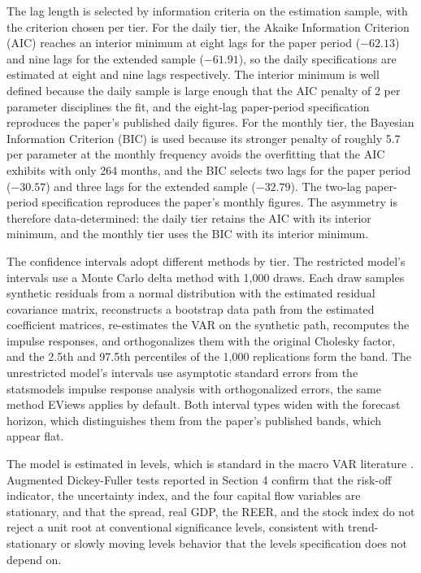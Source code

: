 The lag length is selected by information criteria on the estimation sample, with the criterion chosen per tier. For the daily tier, the Akaike Information Criterion (AIC) reaches an interior minimum at eight lags for the paper period ($-62.13$) and nine lags for the extended sample ($-61.91$), so the daily specifications are estimated at eight and nine lags respectively. The interior minimum is well defined because the daily sample is large enough that the AIC penalty of 2 per parameter disciplines the fit, and the eight-lag paper-period specification reproduces the paper's published daily figures. For the monthly tier, the Bayesian Information Criterion (BIC) is used because its stronger penalty of roughly 5.7 per parameter at the monthly frequency avoids the overfitting that the AIC exhibits with only 264 months, and the BIC selects two lags for the paper period ($-30.57$) and three lags for the extended sample ($-32.79$). The two-lag paper-period specification reproduces the paper's monthly figures. The asymmetry is therefore data-determined: the daily tier retains the AIC with its interior minimum, and the monthly tier uses the BIC with its interior minimum.

The confidence intervals adopt different methods by tier. The restricted model's intervals use a Monte Carlo delta method with 1,000 draws. Each draw samples synthetic residuals from a normal distribution with the estimated residual covariance matrix, reconstructs a bootstrap data path from the estimated coefficient matrices, re-estimates the VAR on the synthetic path, recomputes the impulse responses, and orthogonalizes them with the original Cholesky factor, and the 2.5th and 97.5th percentiles of the 1,000 replications form the band. The unrestricted model's intervals use asymptotic standard errors from the statsmodels impulse response analysis with orthogonalized errors, the same method EViews applies by default. Both interval types widen with the forecast horizon, which distinguishes them from the paper's published bands, which appear flat.

The model is estimated in levels, which is standard in the macro VAR literature \parencite{sims_1980,lutkepohl_2005}. Augmented Dickey-Fuller tests reported in Section 4 confirm that the risk-off indicator, the uncertainty index, and the four capital flow variables are stationary, and that the spread, real GDP, the REER, and the stock index do not reject a unit root at conventional significance levels, consistent with trend-stationary or slowly moving levels behavior that the levels specification does not depend on.

